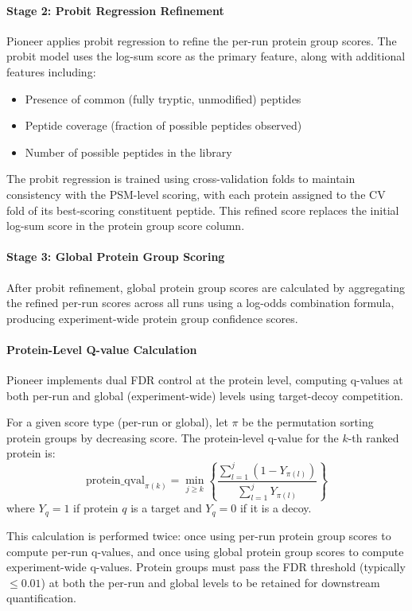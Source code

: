 \documentclass{article}
\begin{document}
\paragraph{Stage 2: Probit Regression Refinement} Pioneer applies probit regression to refine the per-run protein group scores. The probit model uses the log-sum score as the primary feature, along with additional features including:
\begin{itemize}
  \item Presence of common (fully tryptic, unmodified) peptides
  \item Peptide coverage (fraction of possible peptides observed)
  \item Number of possible peptides in the library
\end{itemize}

The probit regression is trained using cross-validation folds to maintain consistency with the PSM-level scoring, with each protein assigned to the CV fold of its best-scoring constituent peptide. This refined score replaces the initial log-sum score in the protein group score column.

\paragraph{Stage 3: Global Protein Group Scoring} After probit refinement, global protein group scores are calculated by aggregating the refined per-run scores across all runs using a log-odds combination formula, producing experiment-wide protein group confidence scores.

\paragraph{Protein-Level Q-value Calculation} Pioneer implements dual FDR control at the protein level, computing q-values at both per-run and global (experiment-wide) levels using target-decoy competition.

For a given score type (per-run or global), let $\pi$ be the permutation sorting protein groups by decreasing score. The protein-level q-value for the $k$-th ranked protein is:
\begin{equation}
\text{protein\_qval}_{\pi(k)} = \min_{j \geq k} \left\{ \frac{\sum_{l=1}^{j} (1 - Y_{\pi(l)})}{\sum_{l=1}^{j} Y_{\pi(l)}} \right\}
\end{equation}
where $Y_q = 1$ if protein $q$ is a target and $Y_q = 0$ if it is a decoy.

This calculation is performed twice: once using per-run protein group scores to compute per-run q-values, and once using global protein group scores to compute experiment-wide q-values. Protein groups must pass the FDR threshold (typically $\leq 0.01$) at both the per-run and global levels to be retained for downstream quantification.
\end{document}
